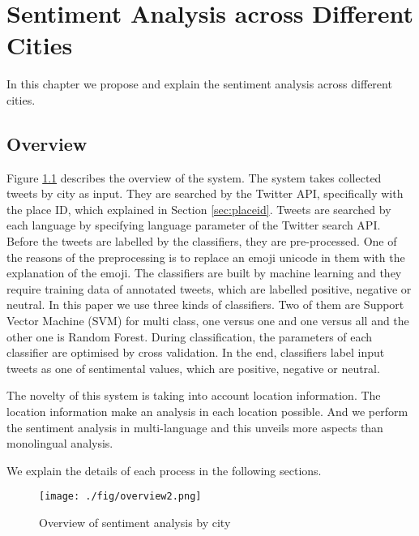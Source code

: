 \chapter{Sentiment Analysis across Different Cities}
In this chapter we propose and explain the sentiment analysis across different cities.
\section{Overview}
Figure \ref{fig:overview} describes the overview of the system.
The system takes collected tweets by city as input.
They are searched by the Twitter API, specifically with the place ID, which explained in Section \ref{sec:placeid}.
Tweets are searched by each language by specifying language parameter of the Twitter search API.
Before the tweets are labelled by the classifiers, they are pre-processed.
One of the reasons of the preprocessing is to replace an emoji unicode in them with the explanation of the emoji.
The classifiers are built by machine learning and they require training data of annotated tweets, which are labelled positive, negative or neutral.
In this paper we use three kinds of classifiers.
Two of them are Support Vector Machine (SVM) for multi class, one versus one and one versus all and the other one is Random Forest.
During classification, the parameters of each classifier are optimised by cross validation.
In the end, classifiers label input tweets as one of sentimental values, which are positive, negative or neutral.

The novelty of this system is taking into account location information.
The location information make an analysis in each location possible.
And we perform the sentiment analysis in multi-language and this unveils more aspects than monolingual analysis.

We explain the details of each process in the following sections.
\begin{figure}
	\centering
	\texttt{[image: ./fig/overview2.png]}
	\caption{Overview of sentiment analysis by city}
	\label{fig:overview}
\end{figure}



